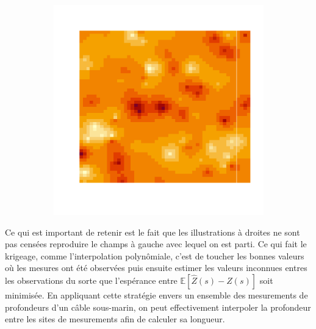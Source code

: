 \documentclass[10pt]{article} %
\begin{document}
\begin{figure}[h!]
\begin{subfigure}[b]{0.3\textwidth}
        \label{fig:three sin x}
    \end{subfigure}
    \hfill
    \begin{subfigure}[b]{0.3\textwidth}
        \centering
        \includegraphics[width=\textwidth]{media/gauss_inter_2.png}
        \label{fig:five over x}
    \end{subfigure}
       \label{fig:three graphs}
\end{figure}

Ce qui est important de retenir est le fait que les illustrations à droites ne sont pas censées reproduire le champs à gauche avec lequel
on est parti. Ce qui fait le krigeage, comme l'interpolation polynômiale, c'est de toucher les bonnes valeurs où les mesures ont été observées puis ensuite
estimer les valeurs inconnues entres les observations du sorte que l'espérance entre $\mathbb{E}[\hat Z(s) - Z(s)]$ soit minimisée. En appliquant cette stratégie envers
un ensemble des mesurements de profondeurs d'un câble sous-marin, on peut effectivement interpoler la profondeur entre les sites de mesurements afin de calculer sa longueur.
\end{document}
